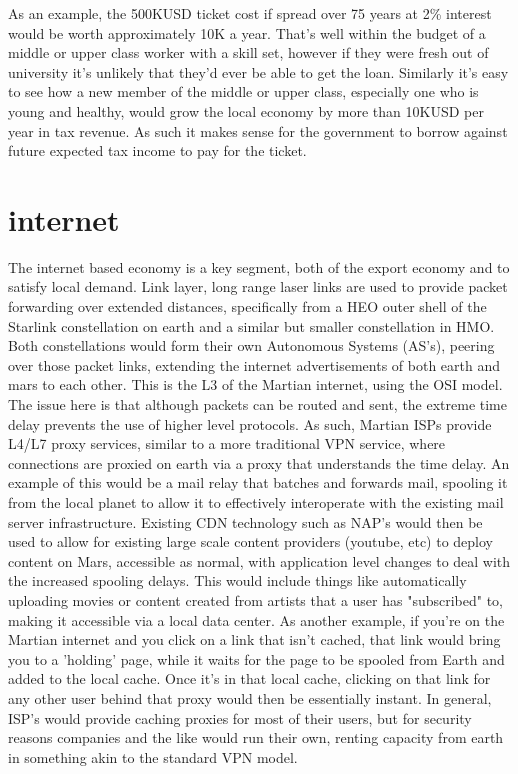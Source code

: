 \documentclass[10pt]{article}
\begin{document}
As an example, the 500KUSD ticket cost if spread over 75 years at 2\% interest would be worth approximately 10K a year. That's well within the budget of a middle or upper class worker with a skill set, however if they were fresh out of university it's unlikely that they'd ever be able to get the loan. Similarly it's easy to see how a new member of the middle or upper class, especially one who is young and healthy, would grow the local economy by more than 10KUSD per year in tax revenue. As such it makes sense for the government to borrow against future expected tax income to pay for the ticket.


\section{internet}
The internet based economy is a key segment, both of the export economy and to satisfy local demand. Link layer, long range laser links are used to provide packet forwarding over extended distances, specifically from a HEO outer shell of the Starlink constellation on earth and a similar but smaller constellation in HMO. Both constellations would form their own Autonomous Systems (AS's), peering over those packet links, extending the internet advertisements of both earth and mars to each other. This is the L3 of the Martian internet, using the OSI model. The issue here is that although packets can be routed and sent, the extreme time delay prevents the use of higher level protocols. As such, Martian ISPs provide L4/L7 proxy services, similar to a more traditional VPN service, where connections are proxied on earth via a proxy that understands the time delay. An example of this would be a mail relay that batches and forwards mail, spooling it from the local planet to allow it to effectively interoperate with the existing mail server infrastructure. Existing CDN technology such as NAP's would then be used to allow for existing large scale content providers (youtube, etc) to deploy content on Mars, accessible as normal, with application level changes to deal with the increased spooling delays. This would include things like automatically uploading movies or content created from artists that a user has "subscribed" to, making it accessible via a local data center. As another example, if you're on the Martian internet and you click on a link that isn't cached, that link would bring you to a 'holding' page, while it waits for the page to be spooled from Earth and added to the local cache. Once it's in that local cache, clicking on that link for any other user behind that proxy would then be essentially instant. In general, ISP's would provide caching proxies for most of their users, but for security reasons companies and the like would run their own, renting capacity from earth in something akin to the standard VPN model.
\end{document}
